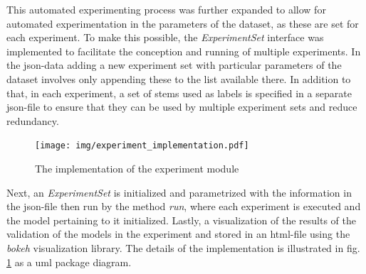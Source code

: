 			This automated experimenting process was further expanded to allow for automated experimentation in the parameters of the dataset, as these are set for each experiment. To make this possible, the \textit{ExperimentSet} interface was implemented to facilitate the conception and running of multiple experiments. In the json-data adding a new experiment set with particular parameters of the dataset involves only appending these to the list available there. In addition to that, in each experiment, a set of stems used as labels is specified in a separate json-file to ensure that they can be used by multiple experiment sets and reduce redundancy.\newline
			\begin{figure}[H]
				\centering
				\texttt{[image: img/experiment\_implementation.pdf]}
				\caption{The implementation of the experiment module}
				\label{fig:experiement_implementation}
			\end{figure}
			Next, an \textit{ExperimentSet} is initialized and parametrized with the information in the json-file then run by the method \textit{run}, where each experiment is executed and the model pertaining to it initialized. Lastly, a visualization of the results of the validation of the models in the experiment and stored in an html-file using the \textit{bokeh} visualization library. The details of the implementation is illustrated in fig. \ref{fig:experiement_implementation} as a uml package diagram.
